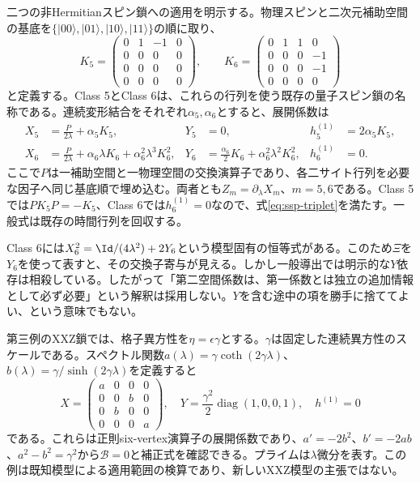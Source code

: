 二つの非Hermitianスピン鎖への適用を明示する。物理スピンと二次元補助空間の基底を$\{|00\rangle,|01\rangle,|10\rangle,|11\rangle\}$の順に取り、
\begin{equation}
K_5=\begin{pmatrix}0&1&-1&0\\0&0&0&0\\0&0&0&0\\0&0&0&0\end{pmatrix},\qquad
K_6=\begin{pmatrix}0&1&1&0\\0&0&0&-1\\0&0&0&-1\\0&0&0&0\end{pmatrix}
\end{equation}
と定義する。Class 5とClass 6は、これらの行列を使う既存の量子スピン鎖の名称である\cite{DFN2026}。連続変形結合をそれぞれ$\alpha_5,\alpha_6$とすると、展開係数は
\begin{align}
X_5&=\frac{P}{2\lambda}+\alpha_5K_5,
&Y_5&=0,&h^{(1)}_5&=2\alpha_5K_5,\\
X_6&=\frac{P}{2\lambda}+\alpha_6\lambda K_6+\alpha_6^2\lambda^3K_6^2,
&Y_6&=\frac{\alpha_6}{2}K_6+\alpha_6^2\lambda^2K_6^2,
&h^{(1)}_6&=0.
\end{align}
ここで$P$は一補助空間と一物理空間の交換演算子であり、各二サイト行列を必要な因子へ同じ基底順で埋め込む。両者とも$Z_m=\partial_\lambda X_m$、$m=5,6$である。Class 5では$PK_5P=-K_5$、Class 6では$h^{(1)}_6=0$なので、式\eqref{eq:ssp-triplet}を満たす。一般式は既存の時間行列を回収する。

Class 6には$X_6^2=\Id/(4\lambda^2)+2Y_6$という模型固有の恒等式がある。このため$\Xi$を$Y_6$を使って表すと、その交換子寄与が見える。しかし一般導出では明示的な$Y$依存は相殺している。したがって「第二空間係数は、第一係数とは独立の追加情報として必ず必要」という解釈は採用しない。$Y$を含む途中の項を勝手に捨ててよい、という意味でもない。

第三例のXXZ鎖では、格子異方性を$\eta=\epsilon\gamma$とする。$\gamma$は固定した連続異方性のスケールである。スペクトル関数$a(\lambda)=\gamma\coth(2\gamma\lambda)$、$b(\lambda)=\gamma/\sinh(2\gamma\lambda)$を定義すると
\begin{equation}
X=\begin{pmatrix}a&0&0&0\\0&0&b&0\\0&b&0&0\\0&0&0&a\end{pmatrix},\quad
Y=\frac{\gamma^2}{2}\operatorname{diag}(1,0,0,1),\quad h^{(1)}=0
\end{equation}
である。これらは正則six-vertex演算子の展開係数であり、$a'=-2b^2$、$b'=-2ab$、$a^2-b^2=\gamma^2$から$\mathcal B=0$と補正式を確認できる。プライムは$\lambda$微分を表す。この例は既知模型による適用範囲の検算であり、新しいXXZ模型の主張ではない。

